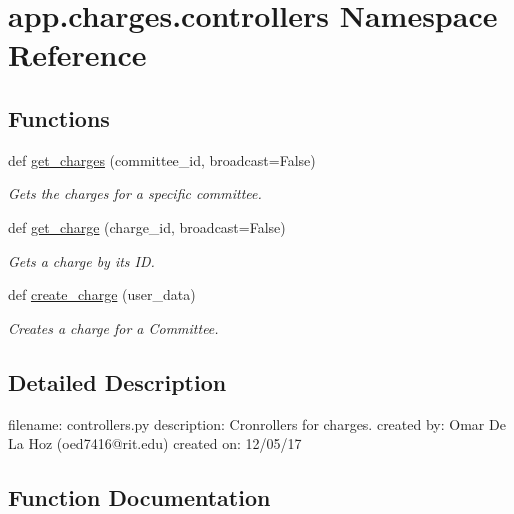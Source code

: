 \hypertarget{namespaceapp_1_1charges_1_1controllers}{}\section{app.\+charges.\+controllers Namespace Reference}
\label{namespaceapp_1_1charges_1_1controllers}
\subsection*{Functions}
\begin{DoxyCompactItemize}
\item 
def \mbox{\hyperlink{namespaceapp_1_1charges_1_1controllers_a30141a884cf96a10060458e66e74aca9}{get\+\_\+charges}} (committee\+\_\+id, broadcast=False)
\begin{DoxyCompactList}\small\item\em Gets the charges for a specific committee. \end{DoxyCompactList}\item 
def \mbox{\hyperlink{namespaceapp_1_1charges_1_1controllers_acde694db95925313933db3ab5ebc3ad0}{get\+\_\+charge}} (charge\+\_\+id, broadcast=False)
\begin{DoxyCompactList}\small\item\em Gets a charge by its ID. \end{DoxyCompactList}\item 
def \mbox{\hyperlink{namespaceapp_1_1charges_1_1controllers_a5376e63b039cd45d5faae35d1d50d55b}{create\+\_\+charge}} (user\+\_\+data)
\begin{DoxyCompactList}\small\item\em Creates a charge for a Committee. \end{DoxyCompactList}\end{DoxyCompactItemize}


\subsection{Detailed Description}
\begin{DoxyVerb}filename: controllers.py
description: Cronrollers for charges.
created by: Omar De La Hoz (oed7416@rit.edu)
created on: 12/05/17
\end{DoxyVerb}
 

\subsection{Function Documentation}
\mbox{\label{namespaceapp_1_1charges_1_1controllers_a5376e63b039cd45d5faae35d1d50d55b}} 
